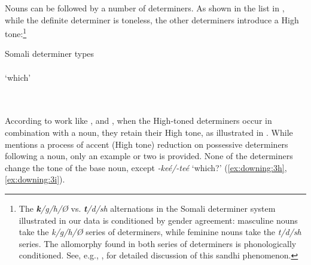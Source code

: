 \documentclass[output=paper]{langscibook}
\begin{document}
Nouns can be followed by a number of determiners. As shown in the list in , while the definite determiner is toneless, the other determiners introduce a High tone:\footnote{The \textit{\textbf{k}/g/h/Ø} vs. \textit{\textbf{t}/d/sh} alternations in the Somali determiner system illustrated in our data is conditioned by gender agreement: masculine nouns take the \textit{k/g/h/Ø} series of determiners, while feminine nouns take the \textit{t/d/sh} series. The allomorphy found in both series of determiners is phonologically conditioned. See, e.g., \citet{Saeed1993,Saeed1999}, for detailed discussion of this sandhi phenomenon.}


\noindent\parbox{\textwidth}{\ea  Somali determiner types \citep[111--117]{Saeed1999} \label{ex:downing:2}
  \\
  \\
   `which'\\
  \\
  \\
  \z
\z}

According to work like \citet{Green2016,Hyman1981}, and \citet{Saeed1993,Saeed1999}, when the High-toned determiners occur in combination with a noun, they retain their High tone, as illustrated in . While \citet[191]{Hyman1981} mentions a process of accent (High tone) reduction on possessive determiners following a noun, only an example or two is provided. None of the determiners change the tone of the base noun, except \textit{{}-keé/-teé} ‘which?’ (\ref{ex:downing:3h}, \ref{ex:downing:3i}).
\end{document}
